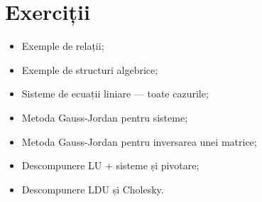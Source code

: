 \documentclass[11pt,a4paper]{article}
\theoremstyle{dotless}
\theoremstyle{dotlessdr}
\begin{document}
\section{Exerciții}

\begin{itemize}
  \item Exemple de relații;
  \item Exemple de structuri algebrice;
  \item Sisteme de ecuații liniare --- toate cazurile;
  \item Metoda Gauss-Jordan pentru sisteme;
  \item Metoda Gauss-Jordan pentru inversarea unei matrice;
  \item Descompunere LU + sisteme și pivotare;
  \item Descompunere LDU și Cholesky.
\end{itemize}
\end{document}
